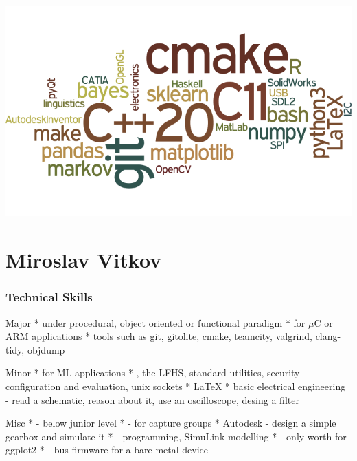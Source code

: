 \documentclass{tccv}
\begin{document}
\graphicspath{{wordcloud}}
\includegraphics[width=\textwidth]{one}


\part{Miroslav Vitkov}


\section{Technical Skills}
\begin{factlist}
\item{Major}
{
     *  under procedural, object oriented or functional paradigm  \mynext
     *  for $\mu$C or ARM applications  \mynext
     * tools such as git, gitolite, cmake, teamcity, valgrind, clang-tidy, objdump
}
\\
\item{Minor}
{
    *  for ML applications  \mynext
    * , the LFHS, standard utilities, security configuration and evaluation, unix sockets  \mynext
    * \LaTeX  \mynext
    * basic electrical engineering - read a schematic, reason about it, use an oscilloscope, desing a filter
}
\\
\item{Misc}
{
    *  - below junior level  \mynext
    *  - for capture groups  \mynext
    * Autodesk  - design a simple gearbox and simulate it  \mynext
    *  - programming, SimuLink modelling  \mynext
    *  - only worth for ggplot2  \mynext
    *  - bus firmware for a bare-metal device
}
\end{factlist}
\end{document}

